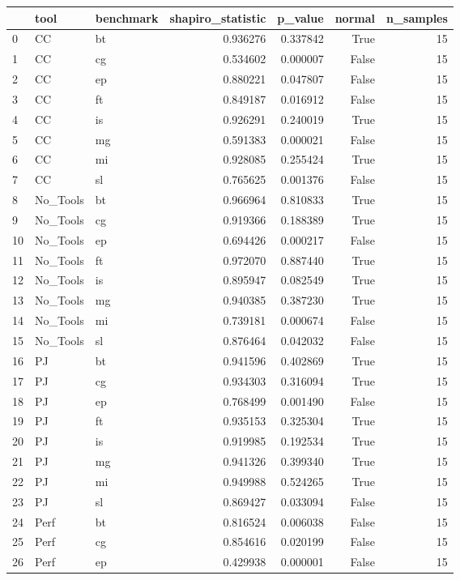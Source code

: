 \begin{tabular}{lllrrrr}
\toprule
 & tool & benchmark & shapiro_statistic & p_value & normal & n_samples \\
\midrule
0 & CC & bt & 0.936276 & 0.337842 & True & 15 \\
1 & CC & cg & 0.534602 & 0.000007 & False & 15 \\
2 & CC & ep & 0.880221 & 0.047807 & False & 15 \\
3 & CC & ft & 0.849187 & 0.016912 & False & 15 \\
4 & CC & is & 0.926291 & 0.240019 & True & 15 \\
5 & CC & mg & 0.591383 & 0.000021 & False & 15 \\
6 & CC & mi & 0.928085 & 0.255424 & True & 15 \\
7 & CC & sl & 0.765625 & 0.001376 & False & 15 \\
8 & No_Tools & bt & 0.966964 & 0.810833 & True & 15 \\
9 & No_Tools & cg & 0.919366 & 0.188389 & True & 15 \\
10 & No_Tools & ep & 0.694426 & 0.000217 & False & 15 \\
11 & No_Tools & ft & 0.972070 & 0.887440 & True & 15 \\
12 & No_Tools & is & 0.895947 & 0.082549 & True & 15 \\
13 & No_Tools & mg & 0.940385 & 0.387230 & True & 15 \\
14 & No_Tools & mi & 0.739181 & 0.000674 & False & 15 \\
15 & No_Tools & sl & 0.876464 & 0.042032 & False & 15 \\
16 & PJ & bt & 0.941596 & 0.402869 & True & 15 \\
17 & PJ & cg & 0.934303 & 0.316094 & True & 15 \\
18 & PJ & ep & 0.768499 & 0.001490 & False & 15 \\
19 & PJ & ft & 0.935153 & 0.325304 & True & 15 \\
20 & PJ & is & 0.919985 & 0.192534 & True & 15 \\
21 & PJ & mg & 0.941326 & 0.399340 & True & 15 \\
22 & PJ & mi & 0.949988 & 0.524265 & True & 15 \\
23 & PJ & sl & 0.869427 & 0.033094 & False & 15 \\
24 & Perf & bt & 0.816524 & 0.006038 & False & 15 \\
25 & Perf & cg & 0.854616 & 0.020199 & False & 15 \\
26 & Perf & ep & 0.429938 & 0.000001 & False & 15 \\

\end{tabular}
